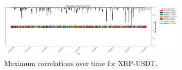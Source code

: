\documentclass[11pt]{article}
\begin{document}
\begin{figure}[p]
    \vspace{0.1cm}

    \begin{subfigure}{\linewidth}
        \centering
        \includegraphics[width=\linewidth]{../assets/correlations/XRP-USDT.png}
        \caption{Maximum correlations over time for XRP-USDT.}
        \label{fig:xrp-corr}
    \end{subfigure}
    \caption{}
    \label{fig:correlations2}
\end{figure}
\end{document}

